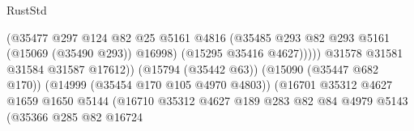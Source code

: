 \begin{lexlean}{RustStd}
\begin{coremodule}
                                                          (@35477
                                                            @297
                                                            @124
                                                            @82
                                                            @25
                                                            @5161
                                                            @4816
                                                            (@35485
                                                              @293
                                                              @82
                                                              @293
                                                              @5161
                                                              (@15069 (@35490 @293))
                                                              @16998)
                                                            (@15295 @35416 @4627)))))
                                                    @31578
                                                    @31581
                                                    @31584
                                                    @31587
                                                    @17612))
                                                (@15794 (@35442 @63))
                                                (@15090 (@35447 @682 @170))
                                                (@14999 (@35454 @170 @105 @4970 @4803))
                                                (@16701
                                                  @35312
                                                  @4627
                                                  @1659
                                                  @1650
                                                  @5144
                                                  (@16710
                                                    @35312
                                                    @4627
                                                    @189
                                                    @283
                                                    @82
                                                    @84
                                                    @4979
                                                    @5143
                                                    (@35366
                                                      @285
                                                      @82
                                                      @16724

\end{coremodule}
\end{lexlean}
